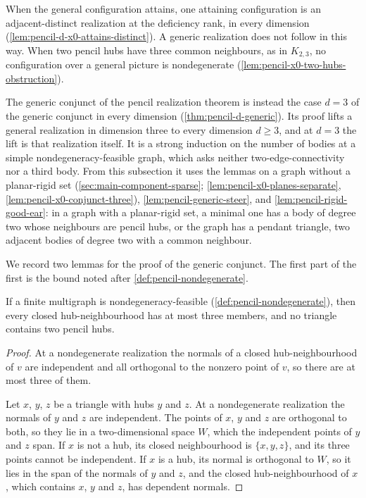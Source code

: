When the general configuration attains, one attaining configuration is
an adjacent-distinct realization at the deficiency rank, in every
dimension (\cref{lem:pencil-d-x0-attains-distinct}). A generic
realization does not follow in this way. When two pencil hubs have three
common neighbours, as in $K_{2,3}$, no configuration over a general
picture is nondegenerate (\cref{lem:pencil-x0-two-hubs-obstruction}).

The generic conjunct of the pencil realization theorem is instead the
case $d = 3$ of the generic conjunct in every dimension
(\cref{thm:pencil-d-generic}). Its proof lifts a general realization in
dimension three to every dimension $d \ge 3$, and at $d = 3$ the lift is
that realization itself. It is a
strong induction on the number of bodies at a simple
nondegeneracy-feasible graph, which asks neither two-edge-connectivity
nor a third body. From this subsection it uses the lemmas on a graph
without a planar-rigid set (\cref{sec:main-component-sparse};
\cref{lem:pencil-x0-planes-separate},
\cref{lem:pencil-x0-conjunct-three}), \cref{lem:pencil-generic-steer},
and \cref{lem:pencil-rigid-good-ear}: in
a graph with a planar-rigid set, a minimal one has a body of degree two
whose neighbours are pencil hubs, or the graph has a pendant triangle,
two adjacent bodies of degree two with a common neighbour.

We record two lemmas for the proof of the generic conjunct. The first
part of the first is the bound noted after
\cref{def:pencil-nondegenerate}.

\begin{lemma}
  \label{lem:pencil-feasible-hub-conditions}
  \leanok
  If a finite multigraph is nondegeneracy-feasible
  (\cref{def:pencil-nondegenerate}), then every closed
  hub-neighbourhood has at most three members, and no triangle contains
  two pencil hubs.
\end{lemma}
\begin{proof}
  \leanok
  At a nondegenerate realization the normals of a closed
  hub-neighbourhood of $v$ are independent and all orthogonal to the
  nonzero point of $v$, so there are at most three of them.

  Let $x$, $y$, $z$ be a triangle with hubs $y$ and $z$. At a
  nondegenerate realization the normals of $y$ and $z$ are independent.
  The points of $x$, $y$ and $z$ are orthogonal to both, so they lie in a
  two-dimensional space $W$, which the independent points of $y$ and $z$
  span. If $x$ is not a hub, its closed neighbourhood is $\{x, y, z\}$,
  and its three points cannot be independent. If $x$ is a hub, its normal
  is orthogonal to $W$, so it lies in the span of the normals of $y$ and
  $z$, and the closed hub-neighbourhood of $x$, which contains $x$, $y$
  and $z$, has dependent normals.
\end{proof}

